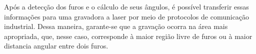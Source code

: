 \documentclass[conference]{IEEEtran}
\begin{document}
Após a detecção dos furos e o cálculo de seus ângulos, é possível transferir essas informações para uma gravadora a laser por meio de protocolos de comunicação industrial. Dessa maneira, garante-se que a gravação ocorra na área mais apropriada, que, nesse caso, corresponde à maior região livre de furos ou à maior distancia angular entre dois furos. 





\end{document}
